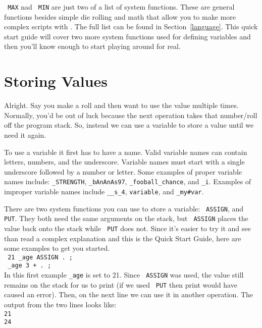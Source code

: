 \texttt{ MAX} nad \texttt{ MIN} are just two of a list of system functions. These are
general functions besides simple die rolling and math that allow you to make
more complex scripts with \progLogo. The full list can be found in 
Section~\ref{language}. This quick start guide will cover two more system
functions used for defining variables and then you'll know enough to start
playing around for real.

\section{Storing Values}
\label{firstVariables}
Alright. Say you make a roll and then want to use the value multiple times.
Normally, you'd be out of luck because the next operation takes that number/roll
off the program stack. So, instead we can use a variable to store a value
until we need it again.

To use a variable it first has to have a name. Valid variable names can contain
letters, numbers, and the underscore. Variable names must start with a single
underscore followed by a number or letter. Some examples of proper variable
names include: \texttt{\_STRENGTH}, \texttt{\_bAnAnAs97},
\texttt{\_fooball\_chance}, and \texttt{\_i}. Examples of improper variable names
include \texttt{\_\_s\_4}, \texttt{variable}, and \texttt{\_my\#var}. 

There are two system functions you can use to store a variable:
\texttt{ ASSIGN}, and \texttt{ PUT}. They both need the same arguments on the
stack, but \texttt{ ASSIGN} places the value back onto the stack while \texttt{ PUT}
does not. Since it's easier to try it and see than read a complex explanation
and this is the Quick Start Guide, here are some examples to get you started.\\
\indent \texttt{ 21 \_age ASSIGN . ;}\\
\indent \texttt{ \_age 3 + . ;}\\
In this first example \texttt{\_age} is set to 21. Since \texttt{ ASSIGN} was used, the
value still remains on the stack for us to print (if we used
\texttt{ PUT} then print would have caused an error). Then, on the next line we can
use it in another operation. The output from the two lines looks like:\\
\texttt{21\\24}




